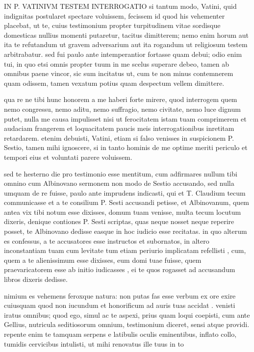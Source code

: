 
 IN P. VATINIVM TESTEM INTERROGATIO si tantum modo, Vatini, quid indignitas postularet spectare voluissem, fecissem id quod his vehementer placebat, ut te, cuius testimonium propter turpitudinem vitae sordisque domesticas nullius momenti putaretur, tacitus dimitterem; nemo enim horum aut ita te refutandum ut gravem adversarium aut ita rogandum ut religiosum testem arbitrabatur. sed fui paulo ante intemperantior fortasse quam debui; odio enim tui, in quo etsi omnis propter tuum in me scelus superare debeo, tamen ab omnibus paene vincor, sic sum incitatus ut, cum te non minus contemnerem quam odissem, tamen vexatum potius quam despectum vellem dimittere.

 qua re ne tibi hunc honorem a me haberi forte mirere, quod interrogem quem nemo congressu, nemo aditu, nemo suffragio, nemo civitate, nemo luce dignum putet, nulla me causa impulisset nisi ut ferocitatem istam tuam comprimerem et audaciam frangerem et loquacitatem paucis meis interrogationibus inretitam retardarem. etenim debuisti, Vatini, etiam si falso venisses in suspicionem P. Sestio, tamen mihi ignoscere, si in tanto hominis de me optime meriti periculo et tempori eius et voluntati parere voluissem.

 sed te hesterno die pro testimonio esse mentitum, cum adfirmares nullum tibi omnino cum Albinovano sermonem non modo de Sestio accusando, sed nulla umquam de re fuisse, paulo ante imprudens indicasti, qui et T. Claudium tecum communicasse et a te consilium P. Sesti accusandi petisse, et Albinovanum, quem antea vix tibi notum esse dixisses, domum tuam venisse, multa tecum locutum dixeris, denique contiones P. Sesti scriptas, quas neque nosset neque reperire posset, te Albinovano dedisse easque in hoc iudicio esse recitatas. in quo alterum es confessus, a te accusatores esse instructos et subornatos, in altero inconstantiam tuam cum levitate tum etiam periurio implicatam refellisti , cum, quem a te alienissimum esse dixisses, eum domi tuae fuisse, quem praevaricatorem esse ab initio iudicasses , ei te quos rogasset ad accusandum libros dixeris dedisse.

 nimium es vehemens feroxque natura: non putas fas esse verbum ex ore exire cuiusquam quod non iucundum et honorificum ad auris tuas accidat . venisti iratus omnibus; quod ego, simul ac te aspexi, prius quam loqui coepisti, cum ante Gellius, nutricula seditiosorum omnium, testimonium diceret, sensi atque providi. repente enim te tamquam serpens e latibulis oculis eminentibus, inflato collo, tumidis cervicibus intulisti, ut mihi renovatus ille tuus in to

